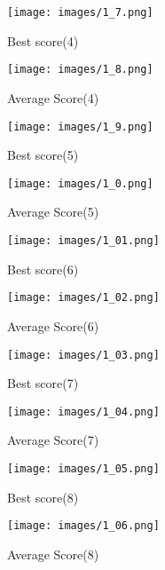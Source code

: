 \documentclass[12pt]{article}
\begin{document}
\begin{figure}[!h]
\centering
\begin{minipage}{.5\textwidth}
  \centering
  \texttt{[image: images/1\_7.png]}
  \caption{Best score(4)}
  \label{fig:my_label}
\end{minipage}%
\begin{minipage}{.5\textwidth}
  \centering
  \texttt{[image: images/1\_8.png]}
  \caption{Average Score(4)}
  \label{fig:my_label}
\end{minipage}
\end{figure}
\begin{figure}[!h]
\centering
\begin{minipage}{.5\textwidth}
  \centering
  \texttt{[image: images/1\_9.png]}
  \caption{Best score(5)}
  \label{fig:my_label}
\end{minipage}%
\begin{minipage}{.5\textwidth}
  \centering
  \texttt{[image: images/1\_0.png]}
  \caption{Average Score(5)}
  \label{fig:my_label}
\end{minipage}
\end{figure}
\begin{figure}[!h]
\centering
\begin{minipage}{.5\textwidth}
  \centering
  \texttt{[image: images/1\_01.png]}
  \caption{Best score(6)}
  \label{fig:my_label}
\end{minipage}%
\begin{minipage}{.5\textwidth}
  \centering
  \texttt{[image: images/1\_02.png]}
  \caption{Average Score(6)}
  \label{fig:my_label}
\end{minipage}
\end{figure}
\begin{figure}[!h]
\centering
\begin{minipage}{.5\textwidth}
  \centering
  \texttt{[image: images/1\_03.png]}
  \caption{Best score(7)}
  \label{fig:my_label}
\end{minipage}%
\begin{minipage}{.5\textwidth}
  \centering
  \texttt{[image: images/1\_04.png]}
  \caption{Average Score(7)}
  \label{fig:my_label}
\end{minipage}
\end{figure}
\begin{figure}[!h]
\centering
\begin{minipage}{.5\textwidth}
  \centering
  \texttt{[image: images/1\_05.png]}
  \caption{Best score(8)}
  \label{fig:my_label}
\end{minipage}%
\begin{minipage}{.5\textwidth}
  \centering
  \texttt{[image: images/1\_06.png]}
  \caption{Average Score(8)}
  \label{fig:my_label}
\end{minipage}
\end{figure}
\end{document}
